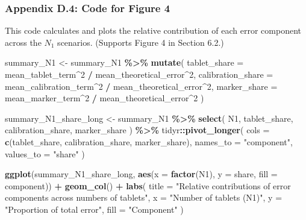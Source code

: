 \documentclass[
  12pt,
]{article}
\newenvironment{Shaded}{\begin{snugshade}}{\end{snugshade}}
\newcommand{\AttributeTok}[1]{\textcolor[rgb]{0.13,0.29,0.53}{#1}}
\newcommand{\DecValTok}[1]{\textcolor[rgb]{0.00,0.00,0.81}{#1}}
\newcommand{\FunctionTok}[1]{\textcolor[rgb]{0.13,0.29,0.53}{\textbf{#1}}}
\newcommand{\NormalTok}[1]{#1}
\newcommand{\OtherTok}[1]{\textcolor[rgb]{0.56,0.35,0.01}{#1}}
\newcommand{\SpecialCharTok}[1]{\textcolor[rgb]{0.81,0.36,0.00}{\textbf{#1}}}
\newcommand{\StringTok}[1]{\textcolor[rgb]{0.31,0.60,0.02}{#1}}
\begin{document}
\subsubsection{Appendix D.4: Code for Figure
4}\label{appendix-d.4-code-for-figure-4}

This code calculates and plots the relative contribution of each error
component across the \(N_1\) scenarios. (Supports Figure 4 in Section
6.2.)

\begin{Shaded}
\begin{Highlighting}[]
\NormalTok{summary\_N1 }\OtherTok{\textless{}{-}}\NormalTok{ summary\_N1 }\SpecialCharTok{\%\textgreater{}\%}
  \FunctionTok{mutate}\NormalTok{(}
    \AttributeTok{tablet\_share =}\NormalTok{ mean\_tablet\_term}\SpecialCharTok{\^{}}\DecValTok{2} \SpecialCharTok{/}\NormalTok{ mean\_theoretical\_error}\SpecialCharTok{\^{}}\DecValTok{2}\NormalTok{,}
    \AttributeTok{calibration\_share =}\NormalTok{ mean\_calibration\_term}\SpecialCharTok{\^{}}\DecValTok{2} \SpecialCharTok{/}\NormalTok{ mean\_theoretical\_error}\SpecialCharTok{\^{}}\DecValTok{2}\NormalTok{,}
    \AttributeTok{marker\_share =}\NormalTok{ mean\_marker\_term}\SpecialCharTok{\^{}}\DecValTok{2} \SpecialCharTok{/}\NormalTok{ mean\_theoretical\_error}\SpecialCharTok{\^{}}\DecValTok{2}
\NormalTok{  )}

\NormalTok{summary\_N1\_share\_long }\OtherTok{\textless{}{-}}\NormalTok{ summary\_N1 }\SpecialCharTok{\%\textgreater{}\%}
  \FunctionTok{select}\NormalTok{(}
\NormalTok{    N1,}
\NormalTok{    tablet\_share,}
\NormalTok{    calibration\_share,}
\NormalTok{    marker\_share}
\NormalTok{  ) }\SpecialCharTok{\%\textgreater{}\%}
\NormalTok{  tidyr}\SpecialCharTok{::}\FunctionTok{pivot\_longer}\NormalTok{(}
    \AttributeTok{cols =} \FunctionTok{c}\NormalTok{(tablet\_share, calibration\_share, marker\_share),}
    \AttributeTok{names\_to =} \StringTok{"component"}\NormalTok{,}
    \AttributeTok{values\_to =} \StringTok{"share"}
\NormalTok{  )}

\FunctionTok{ggplot}\NormalTok{(summary\_N1\_share\_long, }\FunctionTok{aes}\NormalTok{(}\AttributeTok{x =} \FunctionTok{factor}\NormalTok{(N1), }\AttributeTok{y =}\NormalTok{ share, }\AttributeTok{fill =}\NormalTok{ component)) }\SpecialCharTok{+}
  \FunctionTok{geom\_col}\NormalTok{() }\SpecialCharTok{+}
  \FunctionTok{labs}\NormalTok{(}
    \AttributeTok{title =} \StringTok{"Relative contributions of error components across numbers of tablets"}\NormalTok{,}
    \AttributeTok{x =} \StringTok{"Number of tablets (N1)"}\NormalTok{,}
    \AttributeTok{y =} \StringTok{"Proportion of total error"}\NormalTok{,}
    \AttributeTok{fill =} \StringTok{"Component"}
\NormalTok{  )}
\end{Highlighting}
\end{Shaded}
\end{document}
